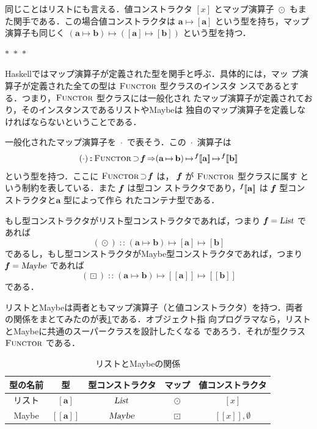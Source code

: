 \documentclass[a5paper,twoside,fleqn,draft]{jsbook}
\def\[{[\![}
\def\]{]\!]}
\newcommand{\separator}{\begin{center}$*$~$*$~$*$\end{center}}
\newcommand{\programminglanguage}[1]{\textsf{#1}}
\newcommand{\haskell}{\programminglanguage{Haskell}}
\DeclareMathOperator{\mSuperClass}{\Rightarrow}
\DeclareMathOperator{\mSuperSet}{\supset}
\newcommand{\mNothing}{\emptyset}
\DeclareMathOperator{\mIn}{{:\!:}}
\DeclareMathOperator{\mMap}{\cdot}
\DeclareMathOperator{\mMapList}{\odot}
\DeclareMathOperator{\mMapMaybe}{\boxdot}
\DeclareMathOperator{\mMapsTo}{\mapsto}
\newcommand{\mType}[1]{\mathbf{#1}} %
\newcommand{\mPolymorphicTypeParameter}[1]{\textbf{\textit{#1}}}
\newcommand{\mA}{\mType{a}}
\newcommand{\mB}{\mType{b}}
\newcommand{\mTypeAssemble}[2]{{}^{\mType{#1}}\[\mType{#2}\]}
\newcommand{\mPolymorphicTypeAssemble}[2]{{}^\mPolymorphicTypeParameter{#1}\[\mType{#2}\]}
\newcommand{\mMaybeType}[1]{\[\mType{#1}\]}%
\newcommand{\mTypeConstructor}[1]{\textsl{#1}}
\DeclareMathOperator{\mListTypeConstructor}{\mTypeConstructor{List}}
\DeclareMathOperator{\mMaybeTypeConstructor}{\mTypeConstructor{Maybe}}
\newcommand{\mValueConstructor}[1]{\mathrm{#1}}
\newcommand{\mValueWith}[2]{{}^\mValueConstructor{#1}\[#2\]}
\newcommand{\mJustWith}[1]{\[#1\]}%
\newcommand{\mTypeClass}[1]{\textsc{#1}} %
\newcommand{\mFunctorTypeClass}{\mTypeClass{Functor}}
\begin{document}
同じことはリストにも言える．値コンストラクタ $[x]$ とマップ演算子
$\mMapList$ もまた関手である．この場合値コンストラクタは
$\mA\mMapsTo[\mA]$ という型を持ち，マップ演算子も同じく
$(\mA\mMapsTo\mB)\mMapsTo([\mA]\mMapsTo[\mB])$ という型を持つ．

\separator

\haskell ではマップ演算子が定義された型を関手と呼ぶ．具体的には，マッ
プ演算子が定義された全ての型は $\mFunctorTypeClass$ 型クラスのインスタ
ンスであるとする．つまり，$\mFunctorTypeClass$ 型クラスには一般化され
たマップ演算子が定義されており，そのインスタンスであるリストやMaybeは
独自のマップ演算子を定義しなければならないということである．

一般化されたマップ演算子を $\mMap$ で表そう．この $\mMap$ 演算子は
\begin{equation}
  (\mMap)
  \mIn{}\mFunctorTypeClass
  \mSuperSet\mPolymorphicTypeParameter{f}
  \mSuperClass(\mA\mMapsTo\mB)
  \mMapsTo\mPolymorphicTypeAssemble{f}{a}
  \mMapsTo\mPolymorphicTypeAssemble{f}{b}
\end{equation}
という型を持つ．ここに
$\mFunctorTypeClass\mSuperSet\mPolymorphicTypeParameter{f}$ は，
$\mPolymorphicTypeParameter{f}$ が $\mFunctorTypeClass$ 型クラスに属す
という制約を表している．また $\mPolymorphicTypeParameter{f}$ は型コン
ストラクタであり，$\mPolymorphicTypeAssemble{f}{a}$ は
$\mPolymorphicTypeParameter{f}$ 型コンストラクタと$\mA$ 型によって作ら
れたコンテナ型である．

もし型コンストラクタがリスト型コンストラクタであれば，つまり
$\mPolymorphicTypeParameter{f}=\mListTypeConstructor$ であれば
\begin{equation}
  (\mMapList)
  \mIn{}(\mA\mMapsTo\mB)\mMapsTo[\mA]\mMapsTo[\mB]
\end{equation}
であるし，もし型コンストラクタがMaybe型コンストラクタであれば，つまり
$\mPolymorphicTypeParameter{f}=\mMaybeTypeConstructor$ であれば
\begin{equation}
  (\mMapMaybe)
  \mIn{}(\mA\mMapsTo\mB)\mMapsTo\mMaybeType{a}\mMapsTo\mMaybeType{b}
\end{equation}
である．

リストとMaybeは両者ともマップ演算子（と値コンストラクタ）を持つ．両者
の関係をまとてみたのが表\ref{tab:list-and-maybe}である．オブジェクト指
向プログラマなら，リストとMaybeに共通のスーパークラスを設計したくなる
であろう．それが型クラス $\mFunctorTypeClass$ である．

\begin{table}
\label{tab:list-and-maybe}
\caption{リストとMaybeの関係}
\begin{center}
\begin{tabular}{||c|c|c|c|c||}\hline
型の名前&型&型コンストラクタ&マップ&値コンストラクタ\\\hline\hline
リスト&$[\mA]$&$\mListTypeConstructor$&$\mMapList$&$[x]$\\
Maybe&$\mMaybeType{a}$&$\mMaybeTypeConstructor$&$\mMapMaybe$&$\mJustWith{x},\mNothing$\\\hline
\end{tabular}
\end{center}
\end{table}
\end{document}
